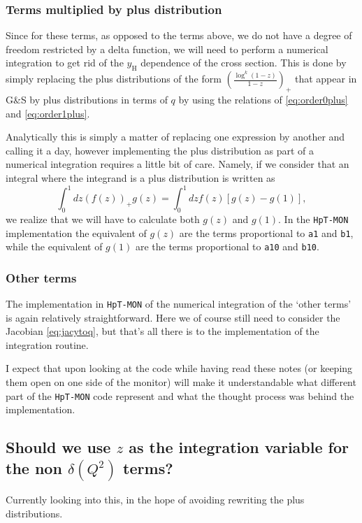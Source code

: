 \documentclass[10pt]{report}
\begin{document}
\subsubsection{Terms multiplied by plus distribution}
Since for these terms, as opposed to the terms above, we do not have a degree of freedom restricted by a delta function, we will need to perform a numerical integration to get rid of the $y_\mathrm{H}$ dependence of the cross section. This is done by simply replacing the plus distributions of the form $\left( \frac{\log ^k (1-z) }{ 1-z } \right)_+$ that appear in G\&S by plus distributions in terms of $q$ by using the relations of \eqref{eq:order0plus} and \eqref{eq:order1plus}.

Analytically this is simply a matter of replacing one expression by another and calling it a day, however implementing the plus distribution as part of a numerical integration requires a little bit of care. Namely, if we consider that an integral where the integrand is a plus distribution is written as 
\begin{equation}
\int_{0}^{1} dz (f(z))_{+} g(z) = \int_{0}^{1} dz f(z)[g(z)-g(1)],
\end{equation}
we realize that we will have to calculate both $g(z)$ and $g(1)$. In the \texttt{HpT-MON} implementation the equivalent of $g(z)$ are the terms proportional to \texttt{a1} and \texttt{b1}, while the equivalent of $g(1)$ are the terms proportional to \texttt{a10} and \texttt{b10}.


\subsubsection{Other terms}
The implementation in \texttt{HpT-MON} of the numerical integration of the `other terms' is again relatively straightforward. Here we of course still need to consider the Jacobian \eqref{eq:jacytoq}, but that's all there is to the implementation of the integration routine. 

I expect that upon looking at the code while having read these notes (or keeping them open on one side of the monitor) will make it understandable what different part of the \texttt{HpT-MON} code represent and what the thought process was behind the implementation. 


\subsection{Should we use $z$ as the integration variable for the non $\delta(Q^2)$ terms?}
Currently looking into this, in the hope of avoiding rewriting the plus distributions. 
\end{document}
